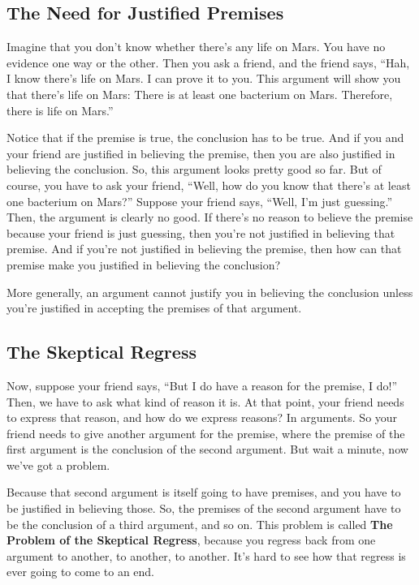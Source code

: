 \documentclass[12pt]{article}
\begin{document}
\subsection{The Need for Justified Premises}
Imagine that you don't know whether there's any life on Mars. You have no evidence one way or the other. Then you ask a friend, and the friend says, ``Hah, I know there's life on Mars. I can prove it to you. This argument will show you that there's life on Mars: There is at least one bacterium on Mars. Therefore, there is life on Mars.''

Notice that if the premise is true, the conclusion has to be true. And if you and your friend are justified in believing the premise, then you are also justified in believing the conclusion. So, this argument looks pretty good so far. But of course, you have to ask your friend, ``Well, how do you know that there's at least one bacterium on Mars?'' Suppose your friend says, ``Well, I'm just guessing.'' Then, the argument is clearly no good. If there's no reason to believe the premise because your friend is just guessing, then you're not justified in believing that premise. And if you're not justified in believing the premise, then how can that premise make you justified in believing the conclusion?

More generally, an argument cannot justify you in believing the conclusion unless you're justified in accepting the premises of that argument.

\subsection{The Skeptical Regress}
Now, suppose your friend says, ``But I do have a reason for the premise, I do!'' Then, we have to ask what kind of reason it is. At that point, your friend needs to express that reason, and how do we express reasons? In arguments. So your friend needs to give another argument for the premise, where the premise of the first argument is the conclusion of the second argument. But wait a minute, now we've got a problem.

Because that second argument is itself going to have premises, and you have to be justified in believing those. So, the premises of the second argument have to be the conclusion of a third argument, and so on. This problem is called \textbf{The Problem of the Skeptical Regress}, because you regress back from one argument to another, to another, to another. It's hard to see how that regress is ever going to come to an end.
\end{document}
